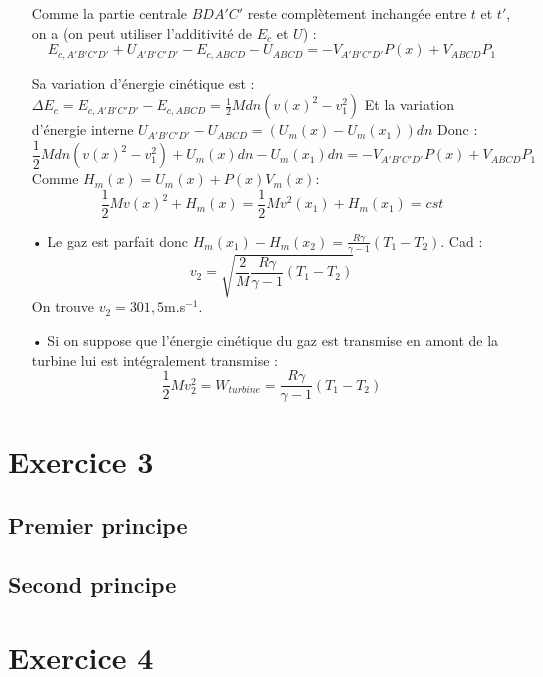 \documentclass{report}
\begin{document}
\begin{itemize}
Comme la partie centrale $BDA'C'$ reste complètement inchangée entre $t$ et $t'$, on a (on peut utiliser l'additivité de $E_c$ et $U$) : 
\begin{equation}
	E_{c,A'B'C'D'} + U_{A'B'C'D'} - E_{c,ABCD} - U_{ABCD}  = -V_{A'B'C'D'}P(x)+V_{ABCD}P_1
\end{equation}

Sa variation d'énergie cinétique est :
 $\Delta E_c =  E_{c,A'B'C'D'} - E_{c,ABCD} = \frac{1}{2}Mdn\left(v(x)^2-v_1^2\right) $
Et la variation d'énergie interne $U_{A'B'C'D'} - U_{ABCD}=(U_m(x) - U_m(x_1))dn$
Donc : 
	\begin{equation}
	\frac{1}{2}Mdn\left(v(x)^2-v_1^2\right) + U_m(x)dn - U_m(x_1)dn = -V_{A'B'C'D'}P(x)+V_{ABCD}P_1
\end{equation}
Comme $H_m(x) = U_m(x)+P(x)V_m(x)$:
	\begin{equation}
	\frac{1}{2}M v(x)^2+ H_m(x)  =\frac{1}{2}M v^2(x_1) + H_m(x_1) = cst
\end{equation}
\item[•] Le gaz est parfait donc $H_m(x_1)-H_m(x_2)=\frac{R\gamma}{\gamma-1}(T_1-T_2)$. Cad : 
\begin{equation}
	v_2=\sqrt{\frac{2}{M}\frac{R\gamma}{\gamma-1}(T_1-T_2)}
\end{equation}
On trouve $v_2=301,5$m.s$^{-1}$.
\item[•] Si on suppose que l'énergie cinétique du gaz est transmise en amont de la turbine lui est intégralement transmise :
\begin{equation}
	\frac{1}{2}Mv_2^2=W_{turbine} = \frac{R\gamma}{\gamma-1}(T_1-T_2)
\end{equation}
\end{itemize}

\section*{Exercice 3}

\subsection*{Premier principe}

\subsection*{Second principe}

\section*{Exercice 4}
\end{document}
